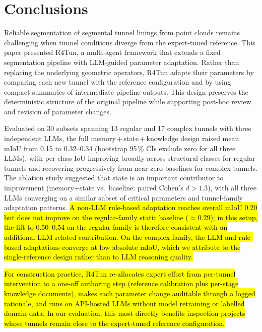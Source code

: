 \documentclass[a4paper,fleqn]{cas-dc}
\begin{document}
{%
\section{Conclusions}\label{sec:conclusions}

Reliable segmentation of segmental tunnel linings from point clouds remains challenging when tunnel conditions diverge from the expert-tuned reference. This paper presented R4Tun, a multi-agent framework that extends a fixed segmentation pipeline with LLM-guided parameter adaptation. Rather than replacing the underlying geometric operators, R4Tun adapts their parameters by comparing each new tunnel with the reference configuration and by using compact summaries of intermediate pipeline outputs. This design preserves the deterministic structure of the original pipeline while supporting post-hoc review and revision of parameter changes.

Evaluated on 30 subsets spanning 13 regular and 17 complex tunnels with three independent LLMs, the full memory\,+\,state\,+\,knowledge design raised mean mIoU from 0.15 to 0.32--0.34 (bootstrap 95\,\% CIs exclude zero for all three LLMs), with per-class IoU improving broadly across structural classes for regular tunnels and recovering progressively from near-zero baselines for complex tunnels. The ablation study suggested that state is an important contributor to improvement (memory+state vs.\ baseline: paired Cohen's $d > 1.3$), with all three LLMs converging on a similar subset of critical parameters and tunnel-family adaptation patterns. \hl{A non-LLM rule-based adaptation reaches overall mIoU 0.20 but does not improve on the regular-family static baseline ($\approx 0.29$); in this setup, the lift to 0.50--0.54 on the regular family is therefore consistent with an additional LLM-related contribution. On the complex family, the LLM and rule-based adaptations converge at low absolute mIoU, which we attribute to the single-reference design rather than to LLM reasoning quality.}

\hl{For construction practice, R4Tun re-allocates expert effort from per-tunnel intervention to a one-off authoring step (reference calibration plus per-stage knowledge documents), makes each parameter change auditable through a logged rationale, and runs on API-hosted LLMs without model retraining or labelled domain data. In our evaluation, this most directly benefits inspection projects whose tunnels remain close to the expert-tuned reference configuration.}

}
\end{document}
